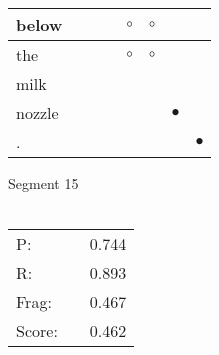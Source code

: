 \documentclass[landscape]{article}
\newcommand{\ssp}{\hspace{2pt}}
\newcommand{\mex}{\cellcolor{g}$\bullet$}
\newcommand{\map}{\cellcolor{y}$\boldsymbol\circ$}
\begin{document}
\begin{tabular}{|l|p{10pt}|p{10pt}|p{10pt}|p{10pt}|p{10pt}|p{10pt}|p{10pt}|}
\hline
\ssp \cellcolor{ref3}below \ssp&\hspace{2pt}&\hspace{2pt}&\hspace{2pt}&\hspace{2pt}\map&\hspace{2pt}\map&\hspace{2pt}&\hspace{2pt}\\
\hline
\ssp \cellcolor{ref3}the \ssp&\hspace{2pt}&\hspace{2pt}&\hspace{2pt}&\hspace{2pt}\map&\hspace{2pt}\map&\hspace{2pt}&\hspace{2pt}\\
\hline
\ssp milk \ssp&\hspace{2pt}&\hspace{2pt}&\hspace{2pt}&\hspace{2pt}&\hspace{2pt}&\hspace{2pt}&\hspace{2pt}\\
\hline
\ssp \cellcolor{ref5}nozzle \ssp&\hspace{2pt}&\hspace{2pt}&\hspace{2pt}&\hspace{2pt}&\hspace{2pt}&\hspace{2pt}\mex&\hspace{2pt}\\
\hline
\ssp \cellcolor{ref6}. \ssp&\hspace{2pt}&\hspace{2pt}&\hspace{2pt}&\hspace{2pt}&\hspace{2pt}&\hspace{2pt}&\hspace{2pt}\mex\\
\hline
\end{tabular}

\vspace{6pt}
\noindent Segment 15\\\\
\noindent\begin{tabular}{lm{12pt}r}
\hline
P:&&0.744\\
R:&&0.893\\
Frag:&&0.467\\
Score:&&0.462\\
\end{tabular}
\end{document}
